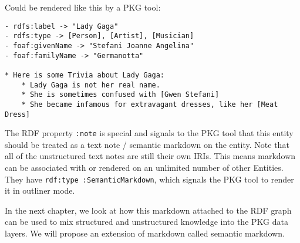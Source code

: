 Could be rendered like this by a PKG tool:

\begin{verbatim}
- rdfs:label -> "Lady Gaga"
- rdfs:type -> [Person], [Artist], [Musician]
- foaf:givenName -> "Stefani Joanne Angelina"
- foaf:familyName -> "Germanotta"

* Here is some Trivia about Lady Gaga:
    * Lady Gaga is not her real name.
    * She is sometimes confused with [Gwen Stefani]
    * She became infamous for extravagant dresses, like her [Meat Dress]
\end{verbatim}


The RDF property \verb|:note| is special and signals to the PKG tool that this entity should be treated as a text note / semantic markdown on the entity. Note that all of the unstructured text notes are still their own IRIs. This means markdown can be associated with or rendered on an unlimited number of other Entities. They have \verb|rdf:type :SemanticMarkdown|, which signals the PKG tool to render it in outliner mode.

In the next chapter, we look at how this markdown attached to the RDF graph can be used to mix structured and unstructured knowledge into the PKG data layers. We will propose an extension of markdown called semantic markdown.
